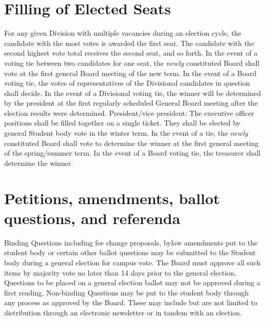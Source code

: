 \section{Filling of Elected Seats}
\begin{enumsubsection}
\itemnotoc For any given Division with multiple vacancies during an election cycle, 
the candidate with the most votes is awarded the first seat. The candidate 
with the second highest vote total receives the second seat, and so forth. 
\itemnotoc In the event of a voting tie between two candidates for one seat, the 
\emph{newly} constituted Board shall vote at the first general Board meeting of the 
new term. In the event of a Board voting tie, the votes of representatives of 
the Divisional candidates in question shall decide. In the event of a Divisional 
voting tie, the winner will be determined by the president at the first regularly 
scheduled General Board meeting after the election results were determined. 
\itemnotoc President/vice president: The executive officer positions shall be filled 
together on a single ticket. They shall be elected by general Student body 
vote in the winter term. In the event of a tie, the \emph{newly} constituted Board shall 
vote to determine the winner at the first general meeting of the 
spring/summer term. In the event of a Board voting tie, the treasurer shall 
determine the winner.
\end{enumsubsection}


\section{Petitions, amendments, ballot questions, and referenda} 
\begin{enumsubsection}
\itemnotoc Binding Questions including fee change proposals, bylaw amendments put to the student body or certain other ballot questions may be submitted to the Student body during a general election for campus vote. The Board must approve all such items by majority vote no later than 14 days prior to the general election. Questions to be placed on a general election ballot may not be approved during a first reading.
\itemnotoc Non-binding Questions may be put to the student body through any process as approved by the Board. These may include but are not limited to distribution through an electronic newsletter or in tandem with an election.
\end{enumsubsection}
